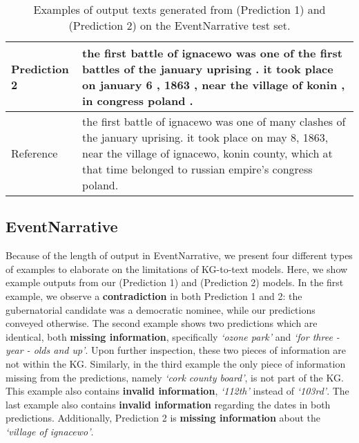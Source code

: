 \documentclass[11pt]{article}
\begin{document}
\begin{table*}[]
\begin{tabular}{l|p{13cm}}
Prediction 2 & the first battle of ignacewo was one of the first battles of the january uprising . it took place on january 6 , 1863 , near the village of konin , in congress poland . \\ \hline
Reference     & the first battle of ignacewo was one of many clashes of the january uprising. it took place on may 8, 1863, near the village of ignacewo, konin county, which at that time belonged to russian empire’s congress poland.                  \\ \midrule[2pt]
\end{tabular}\caption{\label{tab:ExamplesEvent} Examples of output texts generated from  (Prediction 1) and  (Prediction 2) on the EventNarrative test set. }
\end{table*}




\subsection{EventNarrative}
Because of the length of output in EventNarrative, we present four different types of examples to elaborate on the limitations of KG-to-text models. Here, we show example outputs from our  (Prediction 1) and  (Prediction 2) models. In the first example, we observe a \textbf{contradiction} in both Prediction 1 and 2: the gubernatorial candidate was a democratic nominee, while our predictions conveyed otherwise. The second example shows two predictions which are identical, both \textbf{missing information}, specifically \textit{`ozone park'} and \textit{`for three - year - olds and up'}. Upon further inspection, these two pieces of information are not within the KG. Similarly, in the third example the only piece of information missing from the predictions, namely \textit{`cork county board'}, is not part of the KG. This example also contains \textbf{invalid information}, \textit{`112th'} instead of \textit{`103rd'}. The last example also contains \textbf{invalid information} regarding the dates in both predictions. Additionally, Prediction 2 is \textbf{missing information} about the \textit{`village of ignacewo'}.
\end{document}
